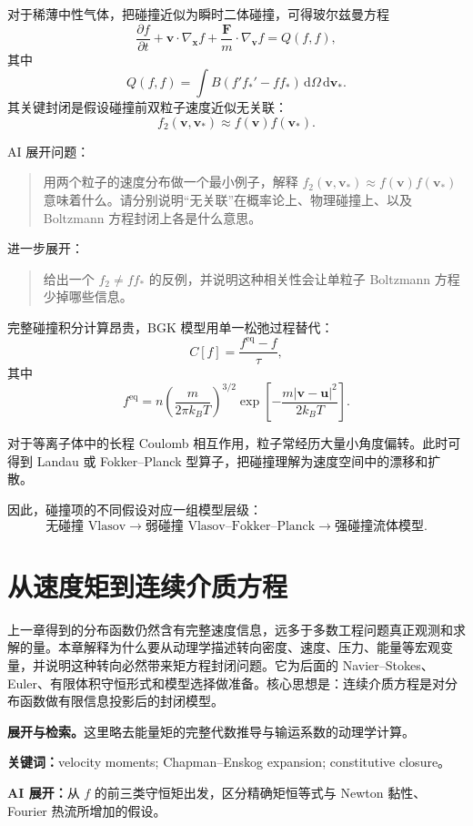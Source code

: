 \documentclass[11pt,openany]{ctexbook}
\newcommand{\dd}{\,\mathrm d}
\newcommand{\studyroute}[3]{%
  \par\smallskip\noindent\textbf{展开与检索。}#1\par
  \noindent\textbf{关键词：}#2。\par
  \noindent\textbf{AI 展开：}#3\par
}
\begin{document}
对于稀薄中性气体，把碰撞近似为瞬时二体碰撞，可得玻尔兹曼方程
\[
\frac{\partial f}{\partial t}
+\bm v\cdot\nabla_{\bm x}f
+\frac{\bm F}{m}\cdot\nabla_{\bm v}f
=Q(f,f),
\]
其中
\[
Q(f,f)
=
\int B\left(f'f_*'-ff_*\right)\dd\Omega\dd\bm v_*.
\]
其关键封闭是假设碰撞前双粒子速度近似无关联：
\[
f_2(\bm v,\bm v_*)\approx f(\bm v)f(\bm v_*).
\]

\begin{askai}
AI 展开问题：
\begin{quote}
用两个粒子的速度分布做一个最小例子，解释 \(f_2(\bm v,\bm v_*)\approx f(\bm v)f(\bm v_*)\) 意味着什么。请分别说明“无关联”在概率论上、物理碰撞上、以及 Boltzmann 方程封闭上各是什么意思。
\end{quote}

进一步展开：
\begin{quote}
给出一个 \(f_2\neq f f_*\) 的反例，并说明这种相关性会让单粒子 Boltzmann 方程少掉哪些信息。
\end{quote}
\end{askai}

完整碰撞积分计算昂贵，BGK 模型用单一松弛过程替代：
\[
C[f]=\frac{f^{\mathrm{eq}}-f}{\tau},
\]
其中
\[
f^{\mathrm{eq}}
=
n\left(\frac{m}{2\pi k_BT}\right)^{3/2}
\exp\left[
-\frac{m|\bm v-\bm u|^2}{2k_BT}
\right].
\]

对于等离子体中的长程 Coulomb 相互作用，粒子常经历大量小角度偏转。此时可得到 Landau 或 Fokker--Planck 型算子，把碰撞理解为速度空间中的漂移和扩散。

因此，碰撞项的不同假设对应一组模型层级：
\[
\text{无碰撞 Vlasov}
\longrightarrow
\text{弱碰撞 Vlasov--Fokker--Planck}
\longrightarrow
\text{强碰撞流体模型}.
\]

\chapter{从速度矩到连续介质方程}

\begin{chaptersummary}
上一章得到的分布函数仍然含有完整速度信息，远多于多数工程问题真正观测和求解的量。本章解释为什么要从动理学描述转向密度、速度、压力、能量等宏观变量，并说明这种转向必然带来矩方程封闭问题。它为后面的 Navier--Stokes、Euler、有限体积守恒形式和模型选择做准备。核心思想是：连续介质方程是对分布函数做有限信息投影后的封闭模型。
\end{chaptersummary}
\studyroute{这里略去能量矩的完整代数推导与输运系数的动理学计算。}{velocity moments; Chapman--Enskog expansion; constitutive closure}{从 $f$ 的前三类守恒矩出发，区分精确矩恒等式与 Newton 黏性、Fourier 热流所增加的假设。}
\end{document}
